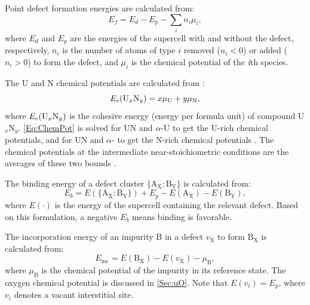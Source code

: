 \documentclass[preprint,12pt,sort&compress]{elsarticle}
\newcommand{\?}{\stackrel{?}{=}}
\begin{document}

Point defect formation energies are calculated from:
\begin{equation}
E_f = E_d - E_p - \sum_i n_i \mu_i,
\end{equation}
where $E_d$ and $E_p$ are the energies of the supercell with and without the defect, respectively, $n_i$ is the number of atoms of type $i$ removed ($n_i < 0$) or added ($n_i > 0$) to form the defect, and $\mu_i$ is the chemical potential of the \textit{i}th species.

The U and N chemical potentials are calculated from \cite{AbdulHameed2024}:
\begin{equation}
E_c(\text{U}_{x}\text{N}_{y}) = x \mu_{\ce{U}} + y \mu_{\ce{N}},
\label{Eq:ChemPot}
\end{equation}
where $E_c(\ce{U$_{x}$N$_{y}$})$ is the cohesive energy (energy per formula unit) of compound U$_x$N$_y$. \cref{Eq:ChemPot} is solved for UN and $\alpha$-U to get the U-rich chemical potentials, and for UN and $\alpha$- to get the N-rich chemical potentials \cite{Huang2020, Yang2021}. The chemical potentials at the intermediate near-stoichiometric conditions are the averages of these two bounds \cite{Woodward1998}.

The binding energy of a defect cluster $\{\text{A}_\text{X} \! : \! \text{B}_\text{Y}\}$ is calculated from:
\begin{equation}
E_b = E(\{\text{A}_\text{X} \! : \! \text{B}_\text{Y}\}) + E_p - E(\text{A}_\text{X}) - E(\text{B}_\text{Y}),
\end{equation}
where $E(\cdot)$ is the energy of the supercell containing the relevant defect. Based on this formulation, a negative $E_b$ means binding is favorable.

The incorporation energy of an impurity B in a defect $v_\text{X}$ to form B$_\text{X}$ is calculated from:
\begin{equation}
E_\text{inc} = E( \text{B}_\text{X} ) - E( v_\text{X} ) - \mu_\text{B},
\end{equation}
where $\mu_\text{B}$ is the chemical potential of the impurity in its reference state. The oxygen chemical potential is discussed in \cref{Sec:uO}. Note that $E( v_i ) = E_p$, where $v_i$ denotes a vacant interstitial site. %
\end{document}
